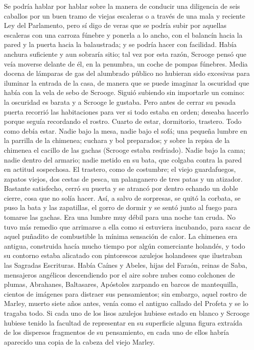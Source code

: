 \documentclass{novela}
\begin{document}
 Se podría hablar por hablar sobre la manera de conducir una diligencia de seis caballos por un buen tramo de viejas escaleras o a través de una mala y reciente Ley del Parlamento, pero sí digo de veras que se podría subir por aquellas escaleras con una carroza fúnebre y ponerla a lo ancho, con el balancín hacia la pared y la puerta hacia la balaustrada; y se podría hacer con facilidad. Había anchura suficiente y aun sobraría sitio; tal vez por esta razón, Scrooge pensó que veía moverse delante de él, en la penumbra, un coche de pompas fúnebres. Media docena de lámparas de gas del alumbrado público no hubieran sido excesivas para iluminar la entrada de la casa, de manera que se puede imaginar la oscuridad que había con la vela de sebo de Scrooge.
 Siguió subiendo sin importarle un comino: la oscuridad es barata y a Scrooge le gustaba. Pero antes de cerrar su pesada puerta recorrió las habitaciones para ver si todo estaba en orden; deseaba hacerlo porque seguía recordando el rostro.
 Cuarto de estar, dormitorio, trastero. Todo como debía estar. Nadie bajo la mesa, nadie bajo el sofá; una pequeña lumbre en la parrilla de la chimenea; cuchara y bol preparados; y sobre la repisa de la chimenea el cacillo de las gachas (Scrooge estaba resfriado). Nadie bajo la cama; nadie dentro del armario; nadie metido en su bata, que colgaba contra la pared en actitud sospechosa. El trastero, como de costumbre; el viejo guardafuegos, zapatos viejos, dos cestas de pesca, un palanganero de tres patas y un atizador.
 Bastante satisfecho, cerró su puerta y se atrancó por dentro echando un doble cierre, cosa que no solía hacer. Así, a salvo de sorpresas, se quitó la corbata, se puso la bata y las zapatillas, el gorro de dormir y se sentó junto al fuego para tomarse las gachas.
 Era una lumbre muy débil para una noche tan cruda. No tuvo más remedio que arrimarse a ella como si estuviera incubando, para sacar de aquel puñadito de combustible la mínima sensación de calor. La chimenea era antigua, construida hacía mucho tiempo por algún comerciante holandés, y todo su contorno estaba alicatado con pintorescos azulejos holandeses que ilustraban las Sagradas Escrituras. Había Caínes y Abeles, hijas del Faraón, reinas de Saba, mensajeros angélicos descendiendo por el aire sobre nubes como colchones de plumas, Abrahanes, Baltasares, Apóstoles zarpando en barcos de mantequilla, cientos de imágenes para distraer sus pensamientos; sin embargo, aquel rostro de Marley, muerto siete años antes, venía como el antiguo callado del Profeta y se lo tragaba todo. Si cada uno de los lisos azulejos hubiese estado en blanco y Scrooge hubiese tenido la facultad de representar en su superficie alguna figura extraída de los dispersos fragmentos de su pensamiento, en cada uno de ellos habría aparecido una copia de la cabeza del viejo Marley.
\end{document}
